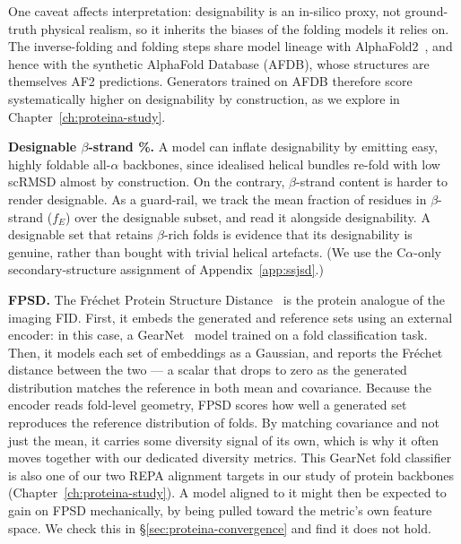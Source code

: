 \documentclass[12pt,a4paper,twoside]{report}
\begin{document}
One caveat affects interpretation: designability is an in-silico proxy, not ground-truth physical realism, so it inherits the biases of the folding models it relies on. The inverse-folding and folding steps share model lineage with AlphaFold2~\cite{AlphaFold2}, and hence with the synthetic AlphaFold Database (AFDB), whose structures are themselves AF2 predictions. Generators trained on AFDB therefore score systematically higher on designability by construction, as we explore in Chapter~\ref{ch:proteina-study}.

\textbf{Designable $\beta$-strand \%.} A model can inflate designability by emitting easy, highly foldable all-$\alpha$ backbones, since idealised helical bundles re-fold with low scRMSD almost by construction. On the contrary, $\beta$-strand content is harder to render designable. As a guard-rail, we track the mean fraction of residues in $\beta$-strand ($f_E$) over the designable subset, and read it alongside designability. A designable set that retains $\beta$-rich folds is evidence that its designability is genuine, rather than bought with trivial helical artefacts. (We use the C$\alpha$-only secondary-structure assignment of Appendix~\ref{app:ssjsd}.)



\textbf{FPSD.} The Fr\'echet Protein Structure Distance~\cite{Proteina} is the protein analogue of the imaging FID. First, it embeds the generated and reference sets using an external encoder: in this case, a GearNet~\cite{GearNet} model trained on a fold classification task. Then, it models each set of embeddings as a Gaussian, and reports the Fr\'echet distance between the two --- a scalar that drops to zero as the generated distribution matches the reference in both mean and covariance. Because the encoder reads fold-level geometry, FPSD scores how well a generated set reproduces the reference distribution of folds. By matching covariance and not just the mean, it carries some diversity signal of its own, which is why it often moves together with our dedicated diversity metrics. This GearNet fold classifier is also one of our two REPA alignment targets in our study of protein backbones (Chapter~\ref{ch:proteina-study}). A model aligned to it might then be expected to gain on FPSD mechanically, by being pulled toward the metric's own feature space. We check this in \S\ref{sec:proteina-convergence} and find it does not hold.
\end{document}

